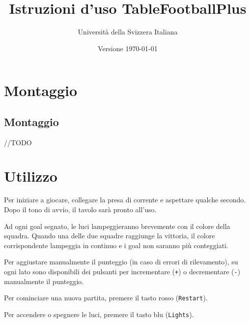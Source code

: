 \documentclass[12pt]{article}
\title{Istruzioni d'uso TableFootballPlus}
\author{Università della Svizzera Italiana}
\date{Versione \today}
\begin{document}
\maketitle
\tableofcontents
\newpage

\section{Montaggio}

	\subsection{Montaggio}

		//TODO
		
		

\section{Utilizzo}

	Per iniziare a giocare, collegare la presa di corrente e aspettare qualche secondo. Dopo il tono di avvio, il tavolo sarà pronto all'uso.
	
	Ad ogni goal segnato, le luci lampeggieranno brevemente con il colore della squadra. Quando una delle due squadre raggiunge la vittoria, il colore corrispondente lampeggia in continuo e i goal non saranno più conteggiati.
	
	Per aggiustare manualmente il punteggio (in caso di errori di rilevamento), su ogni lato sono disponibili dei pulsanti per incrementare (\texttt{+}) o decrementare (\texttt{-}) manualmente il punteggio.
	
	Per cominciare una nuova partita, premere il tasto rosso (\texttt{Restart}).
	
	Per accendere o spegnere le luci, premere il tasto blu (\texttt{Lights}).
	
\end{document}
